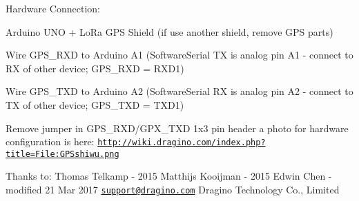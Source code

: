 Hardware Connection\-:
\begin{DoxyItemize}
\item Arduino U\-N\-O + Lo\-Ra G\-P\-S Shield (if use another shield, remove G\-P\-S parts)
\item Wire G\-P\-S\-\_\-\-R\-X\-D to Arduino A1 (Software\-Serial T\-X is analog pin A1 -\/ connect to R\-X of other device; G\-P\-S\-\_\-\-R\-X\-D = R\-X\-D1)
\item Wire G\-P\-S\-\_\-\-T\-X\-D to Arduino A2 (Software\-Serial R\-X is analog pin A2 -\/ connect to T\-X of other device; G\-P\-S\-\_\-\-T\-X\-D = T\-X\-D1)
\item Remove jumper in G\-P\-S\-\_\-\-R\-X\-D/\-G\-P\-X\-\_\-\-T\-X\-D 1x3 pin header a photo for hardware configuration is here\-: \href{http://wiki.dragino.com/index.php?title=File:GPSshiwu.png}{\tt http\-://wiki.\-dragino.\-com/index.\-php?title=\-File\-:\-G\-P\-Sshiwu.\-png}
\end{DoxyItemize}

Thanks to\-: Thomas Telkamp -\/ 2015 Matthijs Kooijman -\/ 2015 Edwin Chen -\/ modified 21 Mar 2017 \href{mailto:support@dragino.com}{\tt support@dragino.\-com} Dragino Technology Co., Limited 

